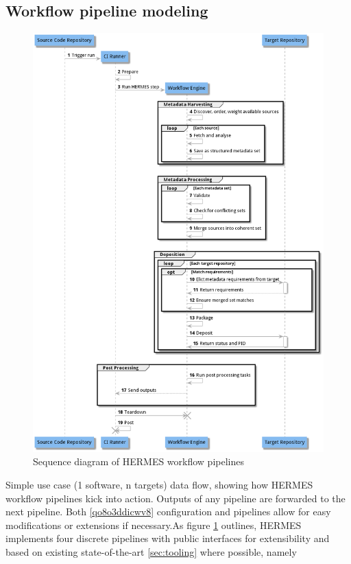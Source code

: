\documentclass{article}
\begin{document}
\subsection{Workflow pipeline modeling}\label{d6s9gv9l0w6e}
\begin{figure}
\centering
\includegraphics[width=\textwidth]{assets/j4ecrtn7gls3.png}
\caption{Sequence diagram of HERMES workflow pipelines}
\label{j4ecrtn7gls3}
\end{figure}
Simple use case (1 software, n targets) data flow, showing how HERMES workflow pipelines kick into action. Outputs of any pipeline are forwarded to the next pipeline. Both \ref{qo8o3ddicwv8} configuration and pipelines allow for easy modifications or extensions if necessary.As figure \ref{j4ecrtn7gls3} outlines, HERMES implements four discrete pipelines with public interfaces for extensibility and based on existing state-of-the-art \ref{sec:tooling} where possible, namely
\end{document}
